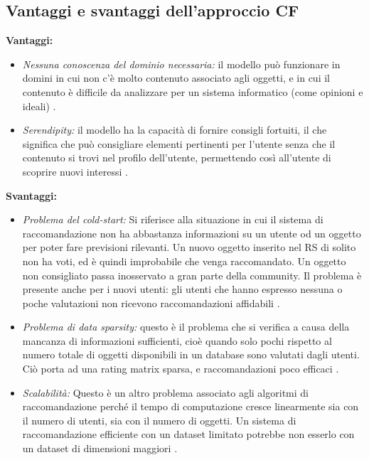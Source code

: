 \subsection{Vantaggi e svantaggi dell'approccio CF} \label{ssec:pros-cons-cf}
\textbf{Vantaggi:}
\begin{itemize}

 \item \textit{Nessuna conoscenza del dominio necessaria:} il modello può funzionare in domini in cui non c'è molto contenuto associato agli oggetti, e in cui il contenuto è difficile da analizzare per un sistema informatico (come opinioni e ideali) \cite{recsys-principle-methods-evaluation}.
 
 \item \textit{Serendipity:} il modello ha la capacità di fornire consigli fortuiti, il che significa che può consigliare elementi pertinenti per l'utente senza che il contenuto si trovi nel profilo dell'utente, permettendo così all'utente di scoprire nuovi interessi \cite{recsys-principle-methods-evaluation} \cite{cf-advantages-google}.
\end{itemize}

\noindent \textbf{Svantaggi:}
\begin{itemize}
 \item \textit{Problema del cold-start:} Si riferisce alla situazione in cui il sistema di raccomandazione non ha abbastanza informazioni su un utente od un oggetto per poter fare previsioni rilevanti. Un nuovo oggetto inserito nel RS di solito non ha voti, ed è quindi improbabile che venga raccomandato. Un oggetto non consigliato passa inosservato a gran parte della community. Il problema è presente anche per i nuovi utenti: gli utenti che hanno espresso nessuna o poche valutazioni non ricevono raccomandazioni affidabili \cite{cold-start}.   
 
 \item  \textit{Problema di data sparsity:} questo è il problema che si verifica a causa della mancanza di informazioni sufficienti, cioè quando solo pochi rispetto al numero totale di oggetti disponibili in un database sono valutati dagli utenti. Ciò porta ad una rating matrix sparsa, e raccomandazioni poco efficaci \cite{recsys-principle-methods-evaluation}.
 
 \item \textit{Scalabilità:} Questo è un altro problema associato agli algoritmi di raccomandazione perché il tempo di computazione cresce linearmente sia con il numero di utenti, sia con il numero di oggetti. Un sistema di raccomandazione efficiente con un dataset limitato potrebbe non esserlo con un dataset di dimensioni maggiori \cite{recsys-principle-methods-evaluation}.
\end{itemize}



